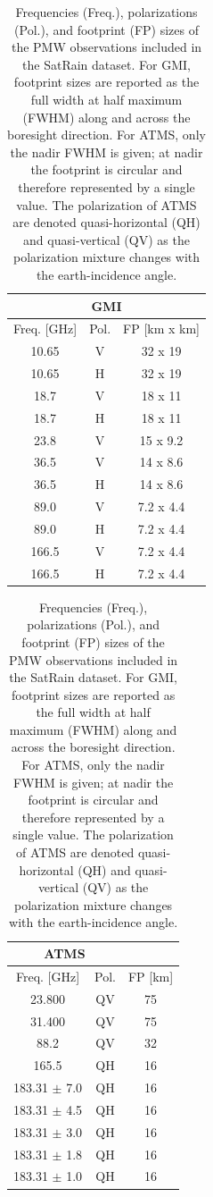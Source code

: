 \documentclass[11pt]{article}
\begin{document}
\begin{table}[htbp]
	\centering
	\begin{subtable}{0.45\textwidth}
		\centering
		\begin{tabular}{ccc}
			\multicolumn{3}{c}{GMI}            \\[0.5ex]
			\toprule
			Freq. [GHz] & Pol. & FP [km x km] \\
			\midrule
			10.65       & V    & 32 x 19       \\
			10.65       & H    & 32 x 19       \\
			18.7        & V    & 18 x 11       \\
			18.7        & H    & 18 x 11       \\
			23.8        & V    & 15 x 9.2      \\
			36.5        & V    & 14 x 8.6      \\
			36.5        & H    & 14 x 8.6      \\
			89.0        & V    & 7.2 x 4.4     \\
			89.0        & H    & 7.2 x 4.4     \\
			166.5       & V    & 7.2 x 4.4     \\
			166.5       & H    & 7.2 x 4.4     \\
			\bottomrule
		\end{tabular}
	\end{subtable}%
	\hfill%
	\begin{subtable}{0.45\textwidth}
		\centering
		\begin{tabular}{ccc}
			\multicolumn{2}{c}{ATMS}           \\[0.5ex]
			\toprule
			Freq. [GHz]       & Pol. & FP [km] \\
			\midrule
			23.800           & QV   & 75       \\
			31.400           & QV   & 75       \\
			88.2             & QV   & 32       \\
			165.5            & QH   & 16       \\
			183.31 $\pm$ 7.0 & QH   & 16       \\
			183.31 $\pm$ 4.5 & QH   & 16       \\
			183.31 $\pm$ 3.0 & QH   & 16       \\
			183.31 $\pm$ 1.8 & QH   & 16       \\
			183.31 $\pm$ 1.0 & QH   & 16       \\
			\bottomrule
		\end{tabular}
	\end{subtable}
	\caption{
	  Frequencies (Freq.), polarizations (Pol.), and footprint (FP) sizes of the
	  PMW observations included in the SatRain dataset. For GMI, footprint sizes are
	  reported as the full width at half maximum (FWHM) along and across the
	  boresight direction. For ATMS, only the nadir FWHM is given; at nadir the
	  footprint is circular and therefore represented by a single value. The
	  polarization of ATMS are denoted quasi-horizontal (QH) and quasi-vertical (QV)
	  as the polarization mixture changes with the earth-incidence angle.
	}
	\label{tab:pmw_channels}
\end{table}
\end{document}
